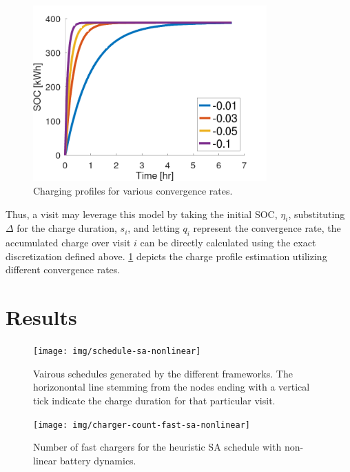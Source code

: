 \documentclass[ee,thesis]{usuthesis}
\begin{document}
\begin{figure}[htpb]
    \centering \includegraphics[width=0.8\textwidth]{img/nonlinear-bat.png}
    \caption{Charging profiles for various convergence rates.}
    \label{fig:convergence-rates}
\end{figure}

Thus, a visit may leverage this model by taking the initial SOC, \(\eta_i\), substituting \(\Delta\) for the charge duration, \(s_i\),
and letting \(q_i\) represent the convergence rate, the accumulated charge over visit \(i\) can be directly calculated using
the exact discretization defined above. \ref{fig:convergence-rates} depicts the charge profile estimation utilizing
different convergence rates.

\section{Results}
\label{sec:nonlinear-results}
\begin{figure}[h]
  \centering
  \texttt{[image: img/schedule-sa-nonlinear]}
  \label{subfig:schedule-nonlinear-sa}
  \caption{Vairous schedules generated by the different frameworks. The horizonontal line stemming from the nodes ending with a vertical tick indicate the charge duration for that particular visit.}
  \label{fig:schedule}
\end{figure}

\begin{figure}[h]
  \centering
  \texttt{[image: img/charger-count-fast-sa-nonlinear]}
  \caption{Number of fast chargers for the heuristic SA schedule with non-linear battery dynamics.}
  \label{subfig:fast-charger-usage-nonlinear-sa}
\end{figure}
\end{document}
